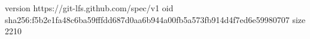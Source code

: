 version https://git-lfs.github.com/spec/v1
oid sha256:f5b2e1fa48c6ba59fffdd687d0aa6b944a00fb5a573fb914d4f7ed6e59980707
size 2210
